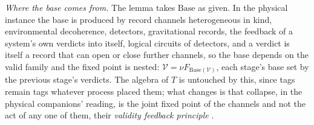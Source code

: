 \textit{Where the base comes from.} The lemma takes $\mathrm{Base}$ as given. In the physical instance the base is produced by record channels heterogeneous in kind, environmental decoherence, detectors, gravitational records, the feedback of a system's own verdicts into itself, logical circuits of detectors, and a verdict is itself a record that can open or close further channels, so the base depends on the valid family and the fixed point is nested: $\mathcal{V} = \nu F_{\mathrm{Base}(\mathcal{V})}$, each stage's base set by the previous stage's verdicts. The algebra of $T$ is untouched by this, since tags remain tags whatever process placed them; what changes is that collapse, in the physical companions' reading, is the joint fixed point of the channels and not the act of any one of them, their \emph{validity feedback principle} \cite{Aethus, AethusQuant}.

